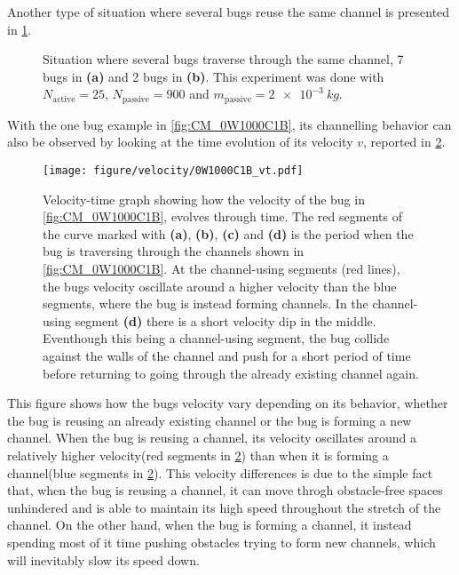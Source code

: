 Another type of situation where several bugs reuse the same 
channel is presented in \cref{fig:CM_0W900C25B}.

\begin{figure}[htpb!]
\centering
{}\quad
{}
\caption{Situation where several bugs traverse through the same channel, 
7 bugs in \textbf{(a)} and 2 bugs in \textbf{(b)}.
This experiment was done with $N_{\text{active}}=25$, $N_{\text{passive}}=900$ and 
$m_{\text{passive}}=\SI{2e-3}{kg}$.} 
\label{fig:CM_0W900C25B}
\end{figure}


With the one bug example in \cref{fig:CM_0W1000C1B}, its channelling behavior 
can also be observed by looking at the time 
evolution of its velocity $v$, reported in \cref{fig:CM_0W1000C1B_vt}.

\begin{figure}[htbp]
    \centering
    \texttt{[image: figure/velocity/0W1000C1B\_vt.pdf]}
    \caption{Velocity-time graph showing how the velocity of 
    the bug in \cref{fig:CM_0W1000C1B}, evolves through time. 
    The red segments of the curve marked with \textbf{(a)}, \textbf{(b)}, 
    \textbf{(c)} and \textbf{(d)} is the period when the bug is traversing 
    through the channels shown in \cref{fig:CM_0W1000C1B}. At the channel-using 
    segments (red lines), the bugs velocity oscillate around a higher velocity 
    than the blue segments, where the bug is instead forming channels. In the 
    channel-using segment \textbf{(d)} there is a short velocity dip in the middle. 
    Eventhough this being a channel-using segment, the bug collide against the walls 
    of the channel and push for a short period of time before returning to going through 
    the already existing channel again.} 
    \label{fig:CM_0W1000C1B_vt}
\end{figure}

This figure shows how the bugs velocity vary depending on its behavior, whether 
the bug is reusing an already existing channel or the bug is forming a new channel. 
When the bug is reusing a channel, its velocity oscillates around a relatively 
higher velocity(red segments in \cref{fig:CM_0W1000C1B_vt}) 
than when it is forming a channel(blue segments in \cref{fig:CM_0W1000C1B_vt}). 
This velocity differences is due to the simple fact that, when the bug 
is reusing a channel, it can move throgh obstacle-free spaces unhindered 
and is able to maintain its high speed throughout the stretch of the channel. 
On the other hand, when the bug is forming a channel, it instead spending 
most of it time pushing obstacles trying to form new channels, which will 
inevitably slow its speed down.   

